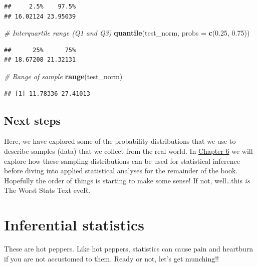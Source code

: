 \documentclass[
]{book}
\newenvironment{Shaded}{\begin{snugshade}}{\end{snugshade}}
\newcommand{\CommentTok}[1]{\textcolor[rgb]{0.56,0.35,0.01}{\textit{#1}}}
\newcommand{\DataTypeTok}[1]{\textcolor[rgb]{0.13,0.29,0.53}{#1}}
\newcommand{\FloatTok}[1]{\textcolor[rgb]{0.00,0.00,0.81}{#1}}
\newcommand{\KeywordTok}[1]{\textcolor[rgb]{0.13,0.29,0.53}{\textbf{#1}}}
\newcommand{\NormalTok}[1]{#1}
\begin{document}
\begin{verbatim}
##     2.5%    97.5% 
## 16.02124 23.95039
\end{verbatim}

\begin{Shaded}
\begin{Highlighting}[]
\CommentTok{# Interquartile range (Q1 and Q3)}
\KeywordTok{quantile}\NormalTok{(test_norm, }\DataTypeTok{probs =} \KeywordTok{c}\NormalTok{(}\FloatTok{0.25}\NormalTok{, }\FloatTok{0.75}\NormalTok{))    }
\end{Highlighting}
\end{Shaded}

\begin{verbatim}
##      25%      75% 
## 18.67208 21.32131
\end{verbatim}

\begin{Shaded}
\begin{Highlighting}[]
\CommentTok{# Range of sample}
\KeywordTok{range}\NormalTok{(test_norm)                             }
\end{Highlighting}
\end{Shaded}

\begin{verbatim}
## [1] 11.78336 27.41013
\end{verbatim}

\hypertarget{next5}{%
\section{Next steps}\label{next5}}

Here, we have explored some of the probability distributions that we use to describe samples (data) that we collect from the real world. In \protect\hyperlink{Chapter6}{Chapter 6} we will explore how these sampling distributions can be used for statistical inference before diving into applied statistical analyses for the remainder of the book. Hopefully the order of things is starting to make some sense! If not, well\ldots this \emph{is} The Worst Stats Text eveR.

\hypertarget{Chapter6}{%
\chapter{Inferential statistics}\label{Chapter6}}

These are hot peppers. Like hot peppers, statistics can cause pain and heartburn if you are not accustomed to them. Ready or not, let's get munching!!
\end{document}
